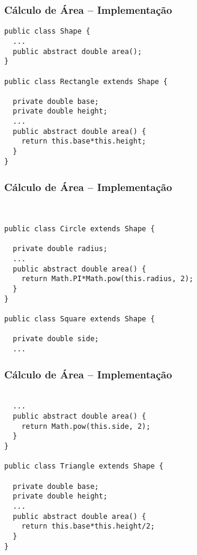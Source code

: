 \begin{frame}[fragile]
\frametitle{Cálculo de Área -- Implementação}
\begin{lstlisting}
public class Shape {
  ...
  public abstract double area();
}

public class Rectangle extends Shape {
  
  private double base;
  private double height;
  ...
  public abstract double area() {
    return this.base*this.height;
  }
}
\end{lstlisting}
\end{frame}

\begin{frame}[fragile]
\frametitle{Cálculo de Área -- Implementação}
\begin{lstlisting}


public class Circle extends Shape {
  
  private double radius;
  ...
  public abstract double area() {
    return Math.PI*Math.pow(this.radius, 2);
  }
}

public class Square extends Shape {
  
  private double side;
  ...
\end{lstlisting}
\end{frame}

\begin{frame}[fragile]
\frametitle{Cálculo de Área -- Implementação}
\begin{lstlisting}

  ...
  public abstract double area() {
    return Math.pow(this.side, 2);
  }
}

public class Triangle extends Shape {
  
  private double base;
  private double height;
  ...
  public abstract double area() {
    return this.base*this.height/2;
  }
}
\end{lstlisting}
\end{frame}
